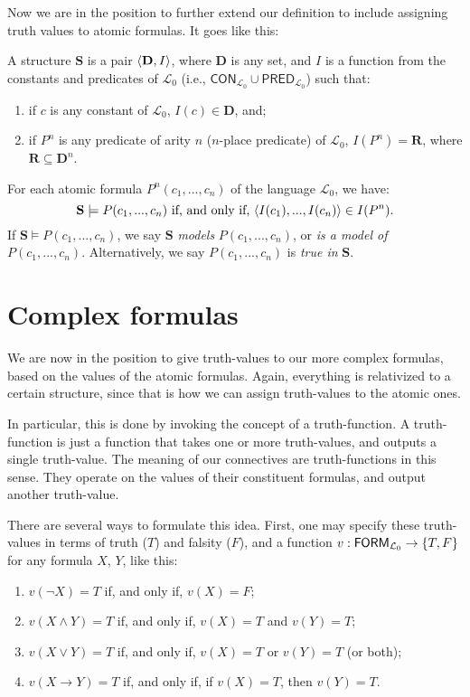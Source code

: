 Now we are in the position to further extend our definition to include assigning truth values to atomic formulas. It goes like this: 

\begin{defn} \label{atomicin}
A structure $\mathbf{S}$ is a pair $\langle\mathbf{D}, I\rangle$, where $\mathbf{D}$ is any set, and $I$ is a function from the constants and predicates of $\mathcal{L}_0$ (i.e., $\mathsf{CON}_{\mathcal{L}_0} \cup \mathsf{PRED}_{\mathcal{L}_0}$) such that:
\begin{enumerate}
	\item if $c$ is any constant of $\mathcal{L}_0$, $I(c) \in \mathbf{D}$, and;
	\item if $P^n$ is any predicate  of arity $n$ ($n$-place predicate) of $\mathcal{L}_0$, $I(P^n)=\mathbf{R}$, where $\mathbf{R} \subseteq \mathbf{D}^n$. 
\end{enumerate}
%
For each atomic formula $P^n(c_1, ..., c_n)$ of the language $\mathcal{L}_0$, we have:
\[
\mathbf{S} \models P(c_1, ..., c_n)\text{ if, and only if, }\langle I(c_1), ..., I(c_n)\rangle \in I(P^n).
\]
If $\mathbf{S} \models P(c_1, ..., c_n)$, we say $\mathbf{S}$ \textit{models} $P(c_1, ..., c_n)$, or \textit{is a model of} $P(c_1, ..., c_n)$. Alternatively, we say $P(c_1, ..., c_n)$ is \textit{true in} $\mathbf{S}$. 
\end{defn}


\section{Complex formulas}

We are now in the position to give truth-values to our more complex formulas, based on the values of the atomic formulas. Again, everything is relativized to a certain structure, since that is how we can assign truth-values to the atomic ones.

In particular, this is done by invoking the concept of a truth-function. A truth-function is just a function that takes one or more truth-values, and outputs a single truth-value. The meaning of our connectives are truth-functions in this sense. They operate on the values of their constituent formulas, and output another truth-value. 

There are several ways to formulate this idea. First, one may specify these truth-values in terms of truth ($T$) and falsity ($F$), and a function $v: \mathsf{FORM}_{\mathcal{L}_0} \to \{T, F\}$ for any formula $X$, $Y$, like this:

\begin{enumerate}
	\item $v(\neg X)=T$ if, and only if, $v(X)=F$;
	\item $v(X \wedge Y)=T$ if, and only if, $v(X)=T$ and $v(Y)=T$;
	\item $v(X \vee Y)=T$ if, and only if, $v(X)=T$ or $v(Y)=T$ (or both);
	\item $v(X \rightarrow Y)=T$ if, and only if, if $v(X)=T$, then $v(Y)=T$. 
\end{enumerate}

